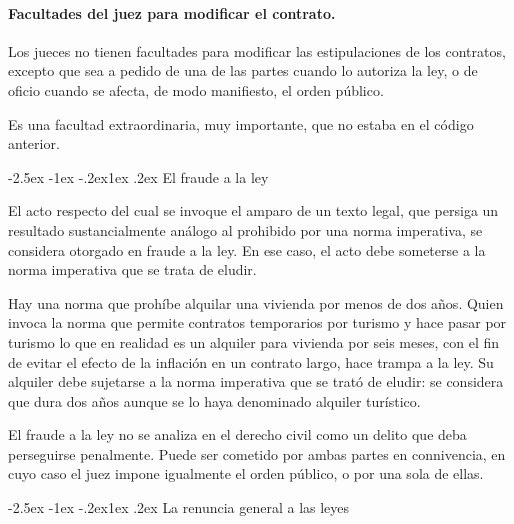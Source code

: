 \documentclass[12pt,oneside]{book}
\makeatletter
\renewcommand\subsection{\@startsection{subsection}{2}{\z@}%
  {-2.5ex \@plus -1ex \@minus -.2ex}{1ex \@plus .2ex}%
  {\normalfont\normalsize\bfseries}}
\makeatother
\begin{document}
\paragraph{Facultades del juez para modificar el contrato.}

\begin{regla}
Los jueces no tienen facultades para modificar las estipulaciones de los contratos, excepto que sea a pedido de una de las partes cuando lo autoriza la ley, o de oficio cuando se afecta, de modo manifiesto, el orden público.
\end{regla}

Es una facultad extraordinaria, muy importante, que no estaba en el código anterior.

\subsection{El fraude a la ley}

\begin{regla}
El acto respecto del cual se invoque el amparo de un texto legal, que persiga un resultado sustancialmente análogo al prohibido por una norma imperativa, se considera otorgado en fraude a la ley. En ese caso, el acto debe someterse a la norma imperativa que se trata de eludir.
\end{regla}

\begin{ejemplo}
Hay una norma que prohíbe alquilar una vivienda por menos de dos años. Quien invoca la norma que permite contratos temporarios por turismo y hace pasar por turismo lo que en realidad es un alquiler para vivienda por seis meses, con el fin de evitar el efecto de la inflación en un contrato largo, hace trampa a la ley. Su alquiler debe sujetarse a la norma imperativa que se trató de eludir: se considera que dura dos años aunque se lo haya denominado alquiler turístico.
\end{ejemplo}

El fraude a la ley no se analiza en el derecho civil como un delito que deba perseguirse penalmente. Puede ser cometido por ambas partes en connivencia, en cuyo caso el juez impone igualmente el orden público, o por una sola de ellas.

\subsection{La renuncia general a las leyes}
\end{document}
